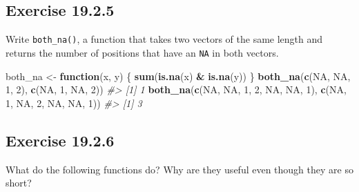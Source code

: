 \documentclass[]{book}
\newenvironment{Shaded}{\begin{snugshade}}{\end{snugshade}}
\newcommand{\CommentTok}[1]{\textcolor[rgb]{0.56,0.35,0.01}{\textit{#1}}}
\newcommand{\ControlFlowTok}[1]{\textcolor[rgb]{0.13,0.29,0.53}{\textbf{#1}}}
\newcommand{\DecValTok}[1]{\textcolor[rgb]{0.00,0.00,0.81}{#1}}
\newcommand{\KeywordTok}[1]{\textcolor[rgb]{0.13,0.29,0.53}{\textbf{#1}}}
\newcommand{\NormalTok}[1]{#1}
\newcommand{\OperatorTok}[1]{\textcolor[rgb]{0.81,0.36,0.00}{\textbf{#1}}}
\newcommand{\OtherTok}[1]{\textcolor[rgb]{0.56,0.35,0.01}{#1}}
\newcommand{\StringTok}[1]{\textcolor[rgb]{0.31,0.60,0.02}{#1}}
\theoremstyle{plain}
\theoremstyle{remark}
\theoremstyle{definition}
\theoremstyle{definition}
\theoremstyle{definition}
\theoremstyle{remark}
\begin{document}
\hypertarget{exercise-19.2.5}{%
\subsection*{\texorpdfstring{Exercise
{19.2.5}}{Exercise 19.2.5}}\label{exercise-19.2.5}}

Write \texttt{both\_na()}, a function that takes two vectors of the same
length and returns the number of positions that have an \texttt{NA} in
both vectors.

\begin{Shaded}
\begin{Highlighting}[]
\NormalTok{both_na <-}\StringTok{ }\ControlFlowTok{function}\NormalTok{(x, y) \{}
  \KeywordTok{sum}\NormalTok{(}\KeywordTok{is.na}\NormalTok{(x) }\OperatorTok{&}\StringTok{ }\KeywordTok{is.na}\NormalTok{(y))}
\NormalTok{\}}
\KeywordTok{both_na}\NormalTok{(}\KeywordTok{c}\NormalTok{(}\OtherTok{NA}\NormalTok{, }\OtherTok{NA}\NormalTok{,  }\DecValTok{1}\NormalTok{, }\DecValTok{2}\NormalTok{),}
        \KeywordTok{c}\NormalTok{(}\OtherTok{NA}\NormalTok{,  }\DecValTok{1}\NormalTok{, }\OtherTok{NA}\NormalTok{, }\DecValTok{2}\NormalTok{))}
\CommentTok{#> [1] 1}
\KeywordTok{both_na}\NormalTok{(}\KeywordTok{c}\NormalTok{(}\OtherTok{NA}\NormalTok{, }\OtherTok{NA}\NormalTok{,  }\DecValTok{1}\NormalTok{, }\DecValTok{2}\NormalTok{, }\OtherTok{NA}\NormalTok{, }\OtherTok{NA}\NormalTok{, }\DecValTok{1}\NormalTok{),}
        \KeywordTok{c}\NormalTok{(}\OtherTok{NA}\NormalTok{,  }\DecValTok{1}\NormalTok{, }\OtherTok{NA}\NormalTok{, }\DecValTok{2}\NormalTok{, }\OtherTok{NA}\NormalTok{, }\OtherTok{NA}\NormalTok{, }\DecValTok{1}\NormalTok{))}
\CommentTok{#> [1] 3}
\end{Highlighting}
\end{Shaded}

\hypertarget{exercise-19.2.6}{%
\subsection*{\texorpdfstring{Exercise
{19.2.6}}{Exercise 19.2.6}}\label{exercise-19.2.6}}

What do the following functions do? Why are they useful even though they
are so short?

\begin{Shaded}
\end{Shaded}
\end{document}
